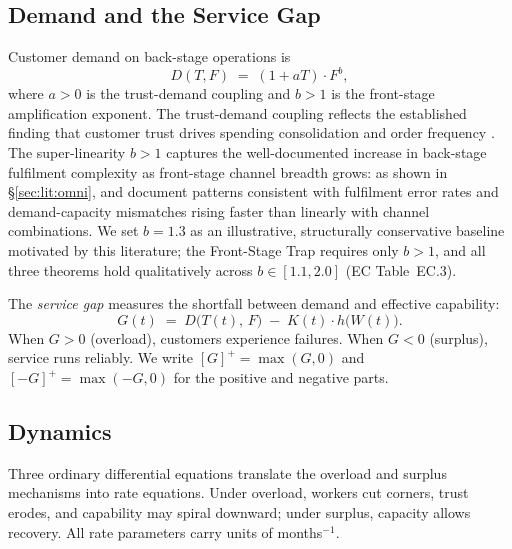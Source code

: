 \documentclass[msom,dblanonrev]{informs4}
\newcommand{\Gp}{[G]^{+}}
\newcommand{\Gm}{[-G]^{+}}
\begin{document}
\subsection{Demand and the Service Gap}\label{sec:model:demand}

Customer demand on back-stage operations is
\begin{equation}\label{eq:demand}
    D(T, F) \;=\; (1 + aT) \cdot F^b,
\end{equation}
where $a > 0$ is the trust-demand coupling and $b > 1$ is the front-stage amplification exponent. The trust-demand coupling reflects the established finding that customer trust drives spending consolidation and order frequency \citep{sirdeshmukh2002consumer, mcknight2002developing}. The super-linearity $b > 1$ captures the well-documented increase in back-stage fulfilment complexity as front-stage channel breadth grows: as shown in \S\ref{sec:lit:omni}, \citet{bell2018inventory} and \citet{acimovic2015fulfillment} document patterns consistent with fulfilment error rates and demand-capacity mismatches rising faster than linearly with channel combinations. We set $b = 1.3$ as an illustrative, structurally conservative baseline motivated by this literature; the Front-Stage Trap requires only $b > 1$, and all three theorems hold qualitatively across $b \in [1.1, 2.0]$ (EC Table~EC.3).

The \emph{service gap} measures the shortfall between demand and effective capability:
\begin{equation}\label{eq:gap}
    G(t) \;=\; D\bigl(T(t),\, F\bigr) \;-\; K(t) \cdot h\bigl(W(t)\bigr).
\end{equation}
When $G > 0$ (overload), customers experience failures. When $G < 0$ (surplus), service runs reliably. We write $\Gp = \max(G,0)$ and $\Gm = \max(-G,0)$ for the positive and negative parts.


\subsection{Dynamics}\label{sec:model:dynamics}

Three ordinary differential equations translate the overload and surplus mechanisms into rate equations. Under overload, workers cut corners, trust erodes, and capability may spiral downward; under surplus, capacity allows recovery. All rate parameters carry units of months$^{-1}$.
\end{document}
